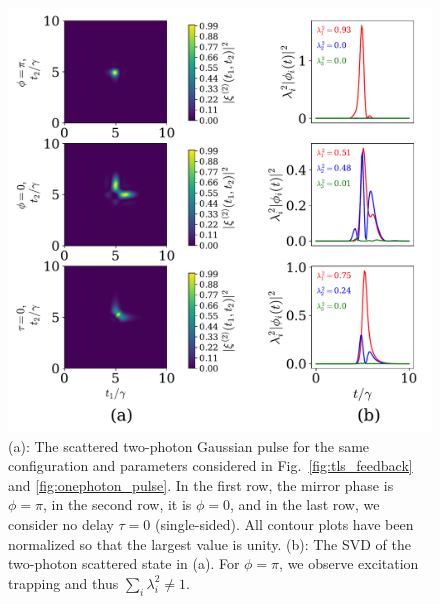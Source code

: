 \begin{figure}
    \centering
    \includegraphics[width=\linewidth]{figures/twophoton_mirror.pdf}
    \caption{(a): The scattered two-photon Gaussian pulse for the same configuration and parameters  considered in Fig.~\ref{fig:tls_feedback} and \ref{fig:onephoton_pulse}. In the first row, the mirror phase is $\phi = \pi$, in the second row, it is $\phi=0$, and in the last row, we consider no delay $\tau=0$ (single-sided). All contour plots have been normalized so that the largest value is unity. (b): The SVD of the two-photon scattered state in (a). For $\phi=\pi$, we observe excitation trapping and thus $\sum_i \lambda_i^2 \neq 1$.}
    \label{fig:twophoton_mirror}
\end{figure}
